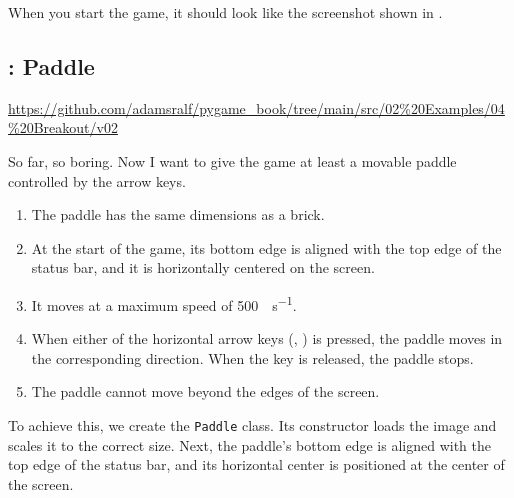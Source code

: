 
When you start the game, it should look like the screenshot shown in .

\subsection{: Paddle}

\begin{diskbox}
	\url{https://github.com/adamsralf/pygame_book/tree/main/src/02%20Examples/04%20Breakout/v02}
\end{diskbox}


So far, so boring. Now I want to give the game at least a movable paddle controlled by the arrow keys.

\begin{enumerate}
	\item The paddle has the same dimensions as a brick.
	\item At the start of the game, its bottom edge is aligned with the top edge of the status bar, and it is horizontally centered on the screen.
	\item It moves at a maximum speed of \SI{500}{\pixel\per\second}.
	\item When either of the horizontal arrow keys (\keys{$\leftarrow$}, \keys{$\rightarrow$}) is pressed, the paddle moves in the corresponding direction. When the key is released, the paddle stops.
	\item The paddle cannot move beyond the edges of the screen.
\end{enumerate}
\er

\begin{figure}%
	\begin{center}%
		\vspace{-6ex}%
	\end{center}%
\end{figure}%
To achieve this, we create the \texttt{Paddle} class. Its constructor loads the image and scales it to the correct size. Next, the paddle's bottom edge is aligned with the top edge of the status bar, and its horizontal center is positioned at the center of the screen. 

